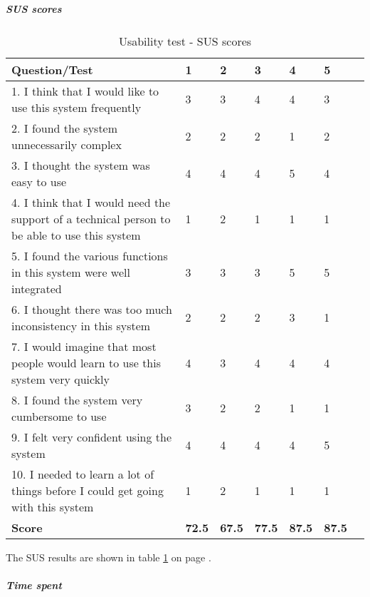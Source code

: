 			\subparagraph{SUS scores}\hfill
\newline
			 	\begin{table}[h!]
\begin{center}
			\begin{tabular}{p{8cm}|l|l|l|l|l|l}	\hline
				\textbf{Question/Test}&\textbf{1}&\textbf{2}&\textbf{3}&\textbf{4}&\textbf{5}\\ \hline \hline
				1. I think that I would like to use this system frequently&3&3&4&4&3\\ \hline
				2. I found the system unnecessarily complex&2&2&2&1&2\\ \hline
				3. I thought the system was easy to use&4&4&4&5&4\\ \hline
				4. I think that I would need the support of a technical person to be able to use this system&1&2&1&1&1\\ \hline
				5. I found the various functions in this system were well integrated&3&3&3&5&5\\ \hline
				6. I thought there was too much inconsistency in this system&2&2&2&3&1\\ \hline
				7. I would imagine that most people would learn to use this system very quickly&4&3&4&4&4\\ \hline
				8. I found the system very cumbersome to use&3&2&2&1&1\\ \hline
				9. I felt very confident using the system&4&4&4&4&5\\ \hline
				10. I needed to learn a lot of things before I could get going with this system&1&2&1&1&1\\ \hline \hline
				\textbf{Score}&\textbf{72.5}&\textbf{67.5}&\textbf{77.5}&\textbf{87.5}&\textbf{87.5}\\ \hline 
				
			\end{tabular}
\end{center}
			\caption{Usability test - SUS scores} \label{tab:usabilitysusscore}
		\end{table}
			The SUS results are shown in table \ref{tab:usabilitysusscore} on page \pageref{tab:usabilitysusscore}.
			\newline
\newline
			\subparagraph{Time spent}\hfill
\newline
